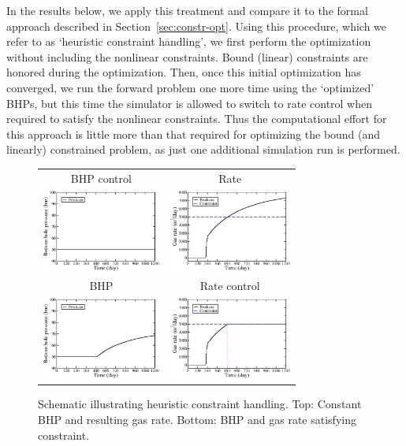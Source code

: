 \documentclass[twocolumn,numbook]{svjour3}          %
\begin{document}
In the results below, we apply this treatment and compare it to the formal
approach described in Section~\ref{sec:constr-opt}. Using this procedure, which
we refer to as `heuristic constraint handling', we first perform the
optimization without including the nonlinear constraints. Bound (linear)
  constraints are honored during the optimization. Then, once this initial
  optimization has converged, we run the forward problem one more time using the
  `optimized' BHPs, but this time the simulator is allowed to switch to rate
  control when required to satisfy the nonlinear constraints. Thus the
  computational effort for this approach is little more than that required for
  optimizing the bound (and linearly) constrained problem, as just one additional simulation run is performed.



\begin{figure}[ht]
\begin{center}
  \begin{tabular}{cc}
    BHP control & Rate \\
    \includegraphics[height=2.7cm]{SimpleBHP_BHP.pdf}
    &
    \includegraphics[height=2.7cm]{SimpleBHP_rate_gas.pdf} \\
    BHP & Rate control \\
    \includegraphics[height=2.7cm]{SimpleRate_BHP.pdf}
    &
    \includegraphics[height=2.7cm]{SimpleRate_rate_gas.pdf} \\
  \end{tabular}
\end{center}
     \caption{Schematic illustrating heuristic constraint handling. Top: Constant BHP and resulting gas rate. Bottom: BHP and gas rate satisfying constraint.}
\label{fig:BHPvsRateControl}
\end{figure}
\end{document}
